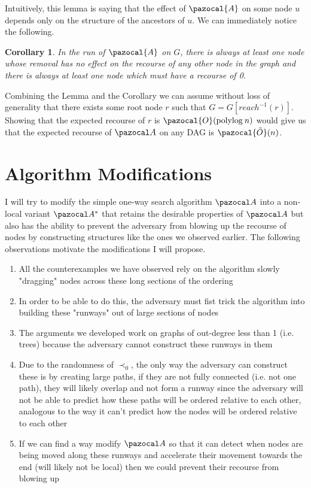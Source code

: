 \documentclass{article}
\newtheorem{corollary}{Corollary}
\begin{document}
Intuitively, this lemma is saying that the effect of $\pazocal{A}$ on some node $u$ depends only on the structure of the ancestors of $u$. We can immediately notice the following.

\begin{corollary}
In the run of $\pazocal{A}$ on $G$, there is always at least one node whose removal has no effect on the recourse of any other node in the graph and there is always at least one node which must have a recourse of 0.
\end{corollary}

Combining the Lemma and the Corollary we can assume without loss of generality that there exists some root node $r$ such that $G = G[reach^{-1}(r)]$. Showing that the expected recourse of $r$ is $\pazocal{O}(\textrm{polylog} \: n)$ would give us that the expected recourse of $\pazocal A$ on any DAG is $\pazocal{\tilde O}(n)$. 

\section{Algorithm Modifications}

I will try to modify the simple one-way search algorithm $\pazocal A$ into a non-local variant $\pazocal A^*$ that retains the desirable properties of $\pazocal A$ but also has the ability to prevent the adversary from blowing up the recourse of nodes by constructing structures like the ones we observed earlier. The following observations motivate the modifications I will propose.

\begin{enumerate}
    \item All the counterexamples we have observed rely on the algorithm slowly "dragging" nodes across these long sections of the ordering
    \item In order to be able to do this, the adversary must fist trick the algorithm into building these "runways" out of large sections of nodes
    \item The arguments we developed work on graphs of out-degree less than 1 (i.e. trees) because the adversary cannot construct these runways in them
    \item Due to the randomness of $\prec_0$, the only way the adversary can construct these is by creating large paths, if they are not fully connected (i.e. not one path), they will likely overlap and not form a runway since the adversary will not be able to predict how these paths will be ordered relative to each other, analogous to the way it can't predict how the nodes will be ordered relative to each other
    \item If we can find a way modify $\pazocal A$ so that it can detect when nodes are being moved along these runways and accelerate their movement towards the end (will likely not be local) then we could prevent their recourse from blowing up
\end{enumerate}
\end{document}
